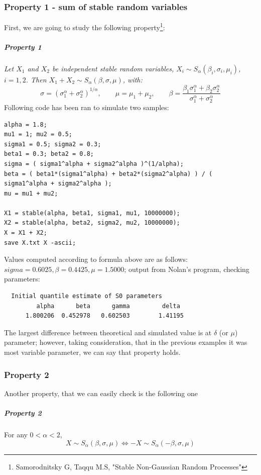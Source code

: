 \documentclass{article}
\begin{document}
\subsubsection{Property 1 - sum of stable random variables}
First, we are going to study the following property\footnote{Samorodnitsky G, Taqqu M.S, "Stable Non-Gaussian Random Processes"}:
\subparagraph{Property 1}
\textit{Let $X_1$ and $X_2$ be independent stable random variables, $X_i \sim S_\alpha(\beta_i, \sigma_i, \mu_i)$, $i = 1,2$. Then $X_1 + X_2 \sim S_\alpha(\beta, \sigma, \mu)$, with: }
\begin{equation}
\sigma = (\sigma_1^\alpha + \sigma_2^\alpha)^{1/\alpha}, \qquad \mu = \mu_1 + \mu_2, \qquad \beta = \frac{\beta_1\sigma_1^\alpha + \beta_2\sigma_2^\alpha}{\sigma_1^\alpha + \sigma_2^\alpha}
\end{equation}
Following code has been ran to simulate two samples:

\begin{lstlisting}
alpha = 1.8;
mu1 = 1; mu2 = 0.5;
sigma1 = 0.5; sigma2 = 0.3;
beta1 = 0.3; beta2 = 0.8;
sigma = ( sigma1^alpha + sigma2^alpha )^(1/alpha);
beta = ( beta1*(sigma1^alpha) + beta2*(sigma2^alpha) ) / ( sigma1^alpha + sigma2^alpha );
mu = mu1 + mu2;

X1 = stable(alpha, beta1, sigma1, mu1, 10000000);
X2 = stable(alpha, beta2, sigma2, mu2, 10000000);
X = X1 + X2;
save X.txt X -ascii;
\end{lstlisting}
Values computed according to formula above are as follows: $sigma = 0.6025, \beta = 0.4425, \mu = 1.5000$; output from Nolan's program, checking parameters:
\begin{lstlisting}
  Initial quantile estimate of S0 parameters
         alpha      beta      gamma         delta
      1.800206  0.452978   0.602503        1.41195 
\end{lstlisting}   
The largest difference between theoretical and simulated value is at $\delta$ (or $\mu$) parameter; however, taking consideration, that in the previous examples it was most variable parameter, we can say that property holds.

\subsubsection{Property 2}
Another property, that we can easily check is the following one
\subparagraph{Property 2}
For any $0 < \alpha < 2$,
\begin{equation}
X \sim S_\alpha(\beta, \sigma, \mu) \iff -X \sim S_\alpha(-\beta, \sigma, \mu)
\end{equation}
\end{document}
